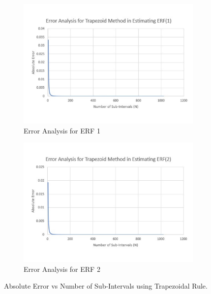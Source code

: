 \documentclass[titlepage, 11pt]{article}
\begin{document}
\begin{figure}[ht]
\begin{subfigure}{.5\textwidth}
  \centering
  \includegraphics[width=\linewidth]{TP2ERF1.pdf}
  \caption{Error Analysis for ERF 1}
  \label{fig:q2b1}
\end{subfigure}
\begin{subfigure}{.5\textwidth}
  \centering
  \includegraphics[width=\linewidth]{TP2ERF2.pdf}
  \caption{Error Analysis for ERF 2}
  \label{fig:q2b2}
\end{subfigure}
\caption{Absolute Error vs Number of Sub-Intervals using Trapezoidal Rule.}
\label{fig:q2b}
\end{figure}
\end{document}
